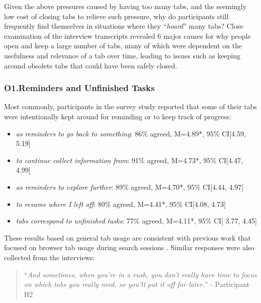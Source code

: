



Given the above pressures caused by having too many tabs, and the seemingly low cost of closing tabs to relieve such pressure, why do participants still frequently find themselves in situations where they ``\emph{hoard}'' many tabs?  Close examination of the interview transcripts revealed 6 major causes for why people open and keep a large number of tabs, many of which were dependent on the usefulness and relevance of a tab over time, leading to issues such as keeping around obsolete tabs that could have been safely closed.



\subsubsection{O1.Reminders and Unfinished Tasks}

Most commonly, participants in the survey study reported that some of their tabs were intentionally kept around for reminding or to keep track of progress:

\begin{itemize}

    \item \emph{as reminders to go back to something}: 86\% agreed, M=4.89*, 95\% CI[4.59, 5.19]
    \item \emph{to continue collect information from}: 91\% agreed, M=4.73*, 95\% CI[4.47, 4.99]
    \item \emph{as reminders to explore further}: 89\% agreed, M=4.70*, 95\% CI[4.44, 4.97]
    \item \emph{to resume where I left off}: 80\% agreed, M=4.41*, 95\% CI[4.08, 4.73]
    \item \emph{tabs correspond to unfinished tasks}: 77\% agreed, M=4.11*, 95\% CI[ 3.77, 4.45] 
    
\end{itemize}

These results based on general tab usage are consistent with previous work that focused on browser tab usage during search sessions \cite{huang2012no}.
Similar responses were also collected from the interviews:

\begin{quote}

``\emph{And sometimes, when you're in a rush, you don't really have time to focus on which tabs you really need, so you'll put it off for later.}'' - Participant H2
\end{quote}

